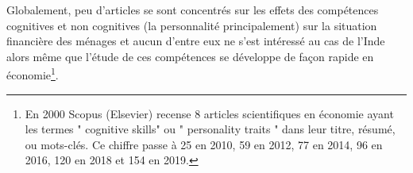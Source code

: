 \documentclass[a4paper, 11pt, onecolumn]{article}
\begin{document}
 Globalement, peu d'articles se sont concentrés sur les effets des compétences cognitives et non cognitives (la personnalité principalement) sur la situation financière des ménages et aucun d'entre eux ne s'est intéressé au cas de l'Inde alors même que l'étude de ces compétences se développe de façon rapide en économie\footnote{En 2000 Scopus (Elsevier) recense 8 articles scientifiques en économie ayant les termes " cognitive skills" ou " personality traits " dans leur titre, résumé, ou mots-clés. Ce chiffre passe à 25 en 2010, 59 en 2012, 77 en 2014, 96 en 2016, 120 en 2018 et 154 en 2019.}.







\end{document}
